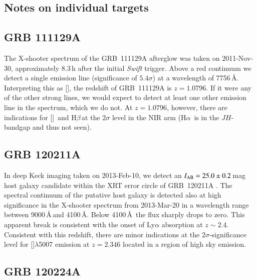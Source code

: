 \documentclass[traditabstract, longauth]{aa}
\newcommand{\hb}{H$\beta$}
\newcommand{\ha}{H$\alpha$}
\newcommand{\oii}{[\ion{O}{ii}]}
\newcommand{\oiii}{[\ion{O}{iii}]}
\begin{document}


\begin{appendix}

\section{Notes on individual targets}
\label{app:newz}

\subsection{GRB 111129A}

The X-shooter spectrum of the GRB~111129A afterglow \citep{2011GCN..12600...1R} was taken on 2011-Nov-30, approximately 8.3\,h after the initial \textit{Swift} trigger. Above a red continuum \citep{2011GCN..12605...1R} we detect a single emission line (significance of $5.4\sigma$) at a wavelength of 7756\,\AA. Interpreting this as \oii, the redshift of GRB~111129A is $z=1.0796$. If it were any of the other strong lines, we would expect to detect at least one other emission line in the spectrum, which we do not. At $z=1.0796$, however, there are indications for \oiii\, and \hb\,at the $2\sigma$ level in the NIR arm (\ha\, is in the $JH$-bandgap and thus not seen).

\subsection{GRB 120211A}

In deep Keck imaging taken on 2013-Feb-10, we detect an $I_{\rm{AB}}=25.0\pm0.2$\,mag host galaxy candidate within the XRT error circle \citep{2012GCN..12922...1G} of GRB~120211A \citep{2012GCN..12920...1S}. The spectral continuum of the putative host galaxy is detected also at high significance in the X-shooter spectrum from 2013-Mar-20 in a wavelength range between 9000\,\AA\,and 4100\,\AA. Below 4100\,\AA\, the flux sharply drops to zero. This apparent break is consistent with the onset of Ly$\alpha$ absorption at $z\sim2.4$. Consistent with this redshift, there are minor indications at the $2\sigma$-significance level for \oiii$\lambda$5007 emission at $z=2.346$ located in a region of high sky emission.

\subsection{GRB 120224A}


\end{appendix}
\end{document}
